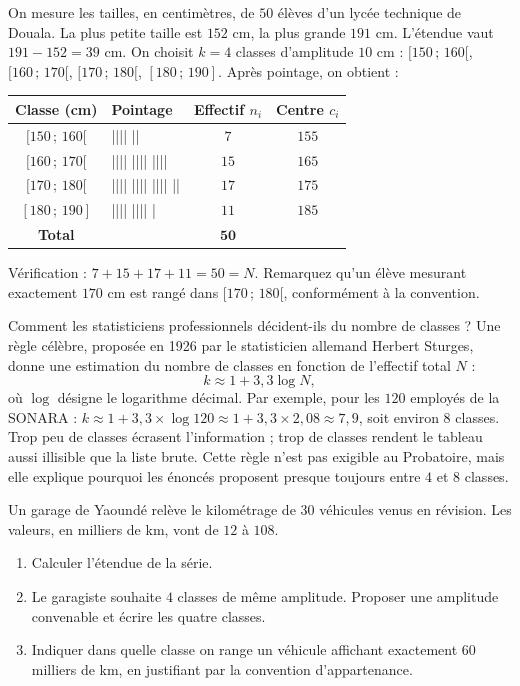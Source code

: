 \documentclass[11pt]{article}
\begin{document}
\begin{exemplebox}
On mesure les tailles, en centimètres, de $50$ élèves d'un lycée technique de Douala. La plus petite taille est $152$ cm, la plus grande $191$ cm. L'étendue vaut $191 - 152 = 39$ cm. On choisit $k = 4$ classes d'amplitude $10$ cm : $[150\,;\,160[$, $[160\,;\,170[$, $[170\,;\,180[$, $[180\,;\,190]$. Après pointage, on obtient :
\begin{center}
\begin{tabularx}{\linewidth}{|c|X|c|c|}
\hline
\rowcolor{popgreenL} \textbf{Classe (cm)} & \textbf{Pointage} & \textbf{Effectif } $n_i$ & \textbf{Centre } $c_i$ \\
\hline
$[150\,;\,160[$ & |||| \;|| & $7$ & $155$ \\
\hline
$[160\,;\,170[$ & |||| |||| |||| & $15$ & $165$ \\
\hline
$[170\,;\,180[$ & |||| |||| |||| \;|| & $17$ & $175$ \\
\hline
$[180\,;\,190]$ & |||| |||| \;| & $11$ & $185$ \\
\hline
\rowcolor{popcream} \textbf{Total} & & $\mathbf{50}$ & \\
\hline
\end{tabularx}
\end{center}
Vérification : $7 + 15 + 17 + 11 = 50 = N$. Remarquez qu'un élève mesurant exactement $170$ cm est rangé dans $[170\,;\,180[$, conformément à la convention.
\end{exemplebox}

\begin{savaistu}
Comment les statisticiens professionnels décident-ils du nombre de classes ? Une règle célèbre, proposée en 1926 par le statisticien allemand Herbert Sturges, donne une estimation du nombre de classes en fonction de l'effectif total $N$ :
\[ k \approx 1 + 3{,}3 \log N, \]
où $\log$ désigne le logarithme décimal. Par exemple, pour les $120$ employés de la SONARA : $k \approx 1 + 3{,}3 \times \log 120 \approx 1 + 3{,}3 \times 2{,}08 \approx 7{,}9$, soit environ $8$ classes. Trop peu de classes écrasent l'information ; trop de classes rendent le tableau aussi illisible que la liste brute. Cette règle n'est pas exigible au Probatoire, mais elle explique pourquoi les énoncés proposent presque toujours entre $4$ et $8$ classes.
\end{savaistu}

\begin{exercice}
Un garage de Yaoundé relève le kilométrage de $30$ véhicules venus en révision. Les valeurs, en milliers de km, vont de $12$ à $108$.
\begin{enumerate}
\item Calculer l'étendue de la série.
\item Le garagiste souhaite $4$ classes de même amplitude. Proposer une amplitude convenable et écrire les quatre classes.
\item Indiquer dans quelle classe on range un véhicule affichant exactement $60$ milliers de km, en justifiant par la convention d'appartenance.
\end{enumerate}
\end{exercice}
\end{document}
